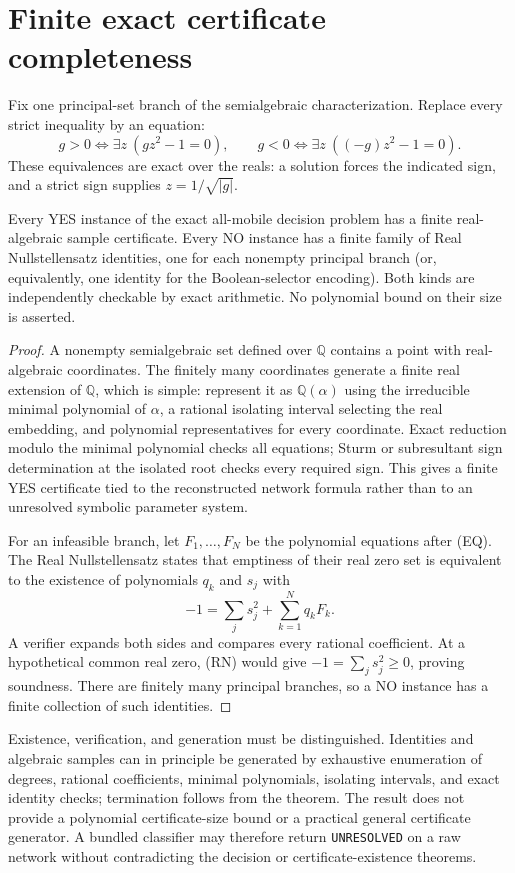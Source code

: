\section{Finite exact certificate completeness}
\label{sec:certificates-independent}

Fix one principal-set branch of the semialgebraic characterization. Replace
every strict inequality by an equation:
\[
 g>0\iff\exists z\ (gz^2-1=0),\qquad
 g<0\iff\exists z\ ((-g)z^2-1=0).
 \tag{EQ}
\]
These equivalences are exact over the reals: a solution forces the indicated
sign, and a strict sign supplies $z=1/\sqrt{|g|}$.

\begin{theorem}
\label{thm:certificates-independent}
Every YES instance of the exact all-mobile decision problem has a finite
real-algebraic sample certificate. Every NO instance has a finite family of
Real Nullstellensatz identities, one for each nonempty principal branch (or,
equivalently, one identity for the Boolean-selector encoding). Both kinds are
independently checkable by exact arithmetic. No polynomial bound on their size
is asserted.
\end{theorem}

\begin{proof}
A nonempty semialgebraic set defined over $\mathbb Q$ contains a point with
real-algebraic coordinates. The finitely many coordinates generate a finite
real extension of $\mathbb Q$, which is simple: represent it as
$\mathbb Q(\alpha)$ using the irreducible minimal polynomial of $\alpha$, a
rational isolating interval selecting the real embedding, and polynomial
representatives for every coordinate. Exact reduction modulo the minimal
polynomial checks all equations; Sturm or subresultant sign determination at
the isolated root checks every required sign. This gives a finite YES
certificate tied to the reconstructed network formula rather than to an
unresolved symbolic parameter system.

For an infeasible branch, let $F_1,\ldots,F_N$ be the polynomial equations
after (EQ). The Real Nullstellensatz states that emptiness of their real zero
set is equivalent to the existence of polynomials $q_k$ and $s_j$ with
\[
 -1=\sum_j s_j^2+\sum_{k=1}^Nq_kF_k.
 \tag{RN}
\]
A verifier expands both sides and compares every rational coefficient. At a
hypothetical common real zero, (RN) would give
$-1=\sum_j s_j^2\geq0$, proving soundness. There are finitely many principal
branches, so a NO instance has a finite collection of such identities.
\end{proof}

Existence, verification, and generation must be distinguished. Identities and
algebraic samples can in principle be generated by exhaustive enumeration of
degrees, rational coefficients, minimal polynomials, isolating intervals, and
exact identity checks; termination follows from the theorem. The result does
not provide a polynomial certificate-size bound or a practical general
certificate generator. A bundled classifier may therefore return
\texttt{UNRESOLVED} on a raw network without contradicting the decision or
certificate-existence theorems.
